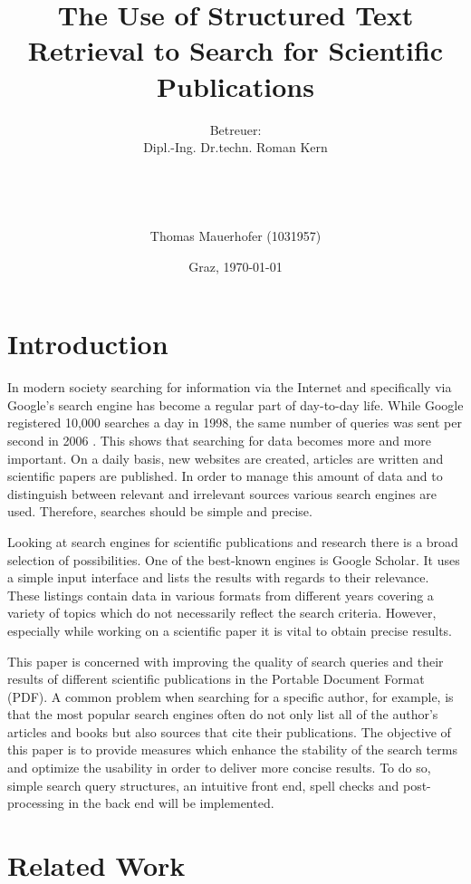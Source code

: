 \documentclass[a4paper, 12pt]{scrartcl}
\title{The Use of Structured Text Retrieval to Search for Scientific Publications}
\author{Betreuer: \\
Dipl.-Ing. Dr.techn. Roman Kern \\ \\ \\ \\ \\
Thomas Mauerhofer (1031957)}
\date{Graz, \today{}}
\begin{document}
\maketitle
 
\newpage

\tableofcontents

\newpage

\section{Introduction}
\label{sec:Introduction}

In modern society searching for information via the Internet and specifically via Google's search engine has become a regular part of
day-to-day life. While Google registered 10,000 searches a day in 1998, the same number of queries was sent per second in 2006 \cite{Google}.
This shows that searching for data becomes more and more important. On a daily basis, new websites are created,
articles are written and scientific papers are published. In order to manage this amount of data and to distinguish between relevant and irrelevant
sources various search engines are used. Therefore, searches should be simple and precise.

Looking at search engines for scientific publications and research there is a broad selection of possibilities. One of the best-known engines is
Google Scholar. It uses a simple input interface and lists the results with regards to their relevance. These listings contain data
in various formats from different years covering a variety of topics which do not necessarily reflect the search criteria. However, especially
while working on a scientific paper it is vital to obtain precise results.

This paper is concerned with improving the quality of search queries and their results of different scientific publications in the Portable Document
Format (PDF). A common problem when searching for a specific author, for example, is that the most popular search engines often do not only list all of
the author's articles and books but also sources that cite their publications. The objective of this paper is to provide measures which enhance the stability of the search
terms and optimize the usability in order to deliver more concise results. To do so, simple search query structures, an intuitive front end, spell checks
and post-processing in the back end will be implemented.

\section{Related Work}
\end{document}
